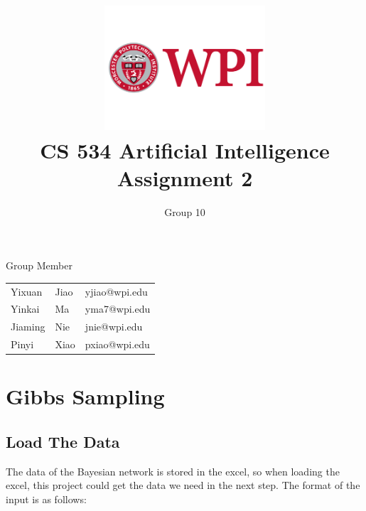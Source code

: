\documentclass[11pt, a4paper]{article}
\title{\includegraphics[width=0.45\textwidth]{wpi2}
        \\CS 534 Artificial Intelligence \\ Assignment 2 }          %
\author{Group 10 }                    %
\begin{document}
\begin{titlepage}
	
\maketitle
{} %

\begin{center}
Group Member
\end{center}

\begin{table}[htbp] 
\begin{center}
\begin{tabular}{l l l} 
	 
	 Yixuan & Jiao  &   yjiao@wpi.edu \\
     Yinkai & Ma  &   yma7@wpi.edu \\
     Jiaming & Nie  &  jnie@wpi.edu \\
     Pinyi & Xiao  &  pxiao@wpi.edu \\
\end{tabular}
\end{center}
\end{table}



\thispagestyle{empty}  %

\end{titlepage}









\section{Gibbs Sampling}


\subsection{Load The Data}

The data of the Bayesian network is stored in the excel, so when loading the excel, this project could get the data we need in the next step. The format of the input is as follows:
\end{document}
